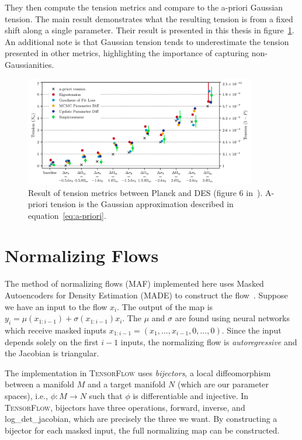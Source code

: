 They then compute the tension metrics and compare to the a-priori Gaussian tension. The main result demonstrates what the resulting tension is from a fixed shift along a single parameter. Their result is presented in this thesis in figure~\ref{fig:planck_des_tension}. An additional note is that Gaussian tension tends to underestimate the tension presented in other metrics, highlighting the importance of capturing non-Gaussianities.
\begin{figure}[tb]
	\centering
	\includegraphics[width=0.9\textwidth]{plots/planck_des_result.png}
	\caption{Result of tension metrics between Planck and DES (figure 6 in~\cite{lemos_assessing_2021}). A-priori tension is the Gaussian approximation described in equation~\ref{eq:a-priori}.}
	\label{fig:planck_des_tension}
\end{figure}
\section{Normalizing Flows}
The method of normalizing flows (MAF) implemented here uses Masked Autoencoders for Density Estimation (MADE) to construct the flow~\cite{germain_made_2015,papamakarios_masked_2018,raveri_non-gaussian_2021}. 
Suppose we have an input to the flow $x_i$. 
The output of the map is $y_i= \mu(x_{1:i-1})+\sigma(x_{1:i-1})x_i$. 
The $\mu$ and $\sigma$ are found using neural networks which receive masked inputs $x_{1:i-1}=(x_1,\ldots,x_{i-1},0,\ldots,0)$. 
Since the input depends solely on the first $i-1$ inputs, the normalizing flow is \textit{autoregressive} and the Jacobian is triangular.

The implementation in \textsc{TensorFlow} uses \textit{bijectors}, a local diffeomorphism between a manifold $M$ and a target manifold $N$ (which are our parameter spaces), i.e., $\phi:M\rightarrow N$ such that $\phi$ is differentiable and injective. 
In \textsc{TensorFlow}, bijectors have three operations, forward, inverse, and log\_det\_jacobian, which are precisely the three we want. 
By constructing a bijector for each masked input, the full normalizing map can be constructed.

